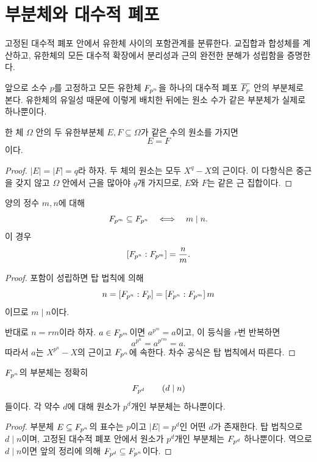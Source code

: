 \clearpage
\section{부분체와 대수적 폐포}
\label{sec:finite-field-subfields}

\begin{learninggoal}
고정된 대수적 폐포 안에서 유한체 사이의 포함관계를 분류한다. 교집합과 합성체를 계산하고, 유한체의 모든 대수적 확장에서 분리성과 근의 완전한 분해가 성립함을 증명한다.
\end{learninggoal}

앞으로 소수 $p$를 고정하고 모든 유한체 $F_{p^n}$을 하나의 대수적 폐포 $\overline{F_p}$ 안의 부분체로 본다. 유한체의 유일성 때문에 이렇게 배치한 뒤에는 원소 수가 같은 부분체가 실제로 하나뿐이다.

\begin{lemma}
한 체 $\Omega$ 안의 두 유한부분체 $E,F\subseteq\Omega$가 같은 수의 원소를 가지면
\[
  E=F
\]
이다.
\end{lemma}

\begin{proof}
$|E|=|F|=q$라 하자. 두 체의 원소는 모두 $X^q-X$의 근이다. 이 다항식은 중근을 갖지 않고 $\Omega$ 안에서 근을 많아야 $q$개 가지므로, $E$와 $F$는 같은 근 집합이다.
\end{proof}

\begin{theorem}
양의 정수 $m,n$에 대해
\[
  F_{p^m}\subseteq F_{p^n}
  \quad\Longleftrightarrow\quad
  m\mid n.
\]
이 경우
\[
  [F_{p^n}:F_{p^m}]=\frac{n}{m}.
\]
\end{theorem}

\begin{proof}
포함이 성립하면 탑 법칙에 의해
\[
  n=[F_{p^n}:F_p]
  =[F_{p^n}:F_{p^m}]\,m
\]
이므로 $m\mid n$이다.

반대로 $n=rm$이라 하자. $a\in F_{p^m}$이면 $a^{p^m}=a$이고, 이 등식을 $r$번 반복하면
\[
  a^{p^n}=a^{p^{rm}}=a.
\]
따라서 $a$는 $X^{p^n}-X$의 근이고 $F_{p^n}$에 속한다. 차수 공식은 탑 법칙에서 따른다.
\end{proof}

\begin{corollary}[부분체의 분류]
$F_{p^n}$의 부분체는 정확히
\[
  F_{p^d}\qquad(d\mid n)
\]
들이다. 각 약수 $d$에 대해 원소가 $p^d$개인 부분체는 하나뿐이다.
\end{corollary}

\begin{proof}
부분체 $E\subseteq F_{p^n}$의 표수는 $p$이고 $|E|=p^d$인 어떤 $d$가 존재한다. 탑 법칙으로 $d\mid n$이며, 고정된 대수적 폐포 안에서 원소가 $p^d$개인 부분체는 $F_{p^d}$ 하나뿐이다. 역으로 $d\mid n$이면 앞의 정리에 의해 $F_{p^d}\subseteq F_{p^n}$이다.
\end{proof}


